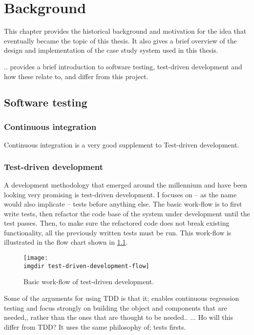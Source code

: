 

\chapter{Background}
This chapter provides the historical background and motivation for the idea that eventually became the topic of this thesis. It also gives a brief overview of the design and implementation of the case study system used in this thesis.

.. provides a brief introduction to software testing, test-driven development and how these relate to, and differ from this project.

\section{Software testing}

\subsection{Continuous integration}
Continuous integration is a very good supplement to Test-driven development.
\subsection{Test-driven development}
A development methodology that emerged around the millennium and have been looking very promising is test-driven development. I focuses on -- as the name would also implicate -- tests before anything else. The basic work-flow is to first write tests, then refactor the code base of the system under development until the test passes. Then, to make sure the refactored code does not break existing functionality, all the previously written tests must be run. This work-flow is illustrated in the flow chart shown in \ref{fig:test-driven-development-flow}.

\begin{figure}[!htbp]
\centering
\texttt{[image: \\imgdir test-driven-development-flow]}
\caption{Basic work-flow of test-driven development.}
\label{fig:test-driven-development-flow}
\end{figure}

Some of the arguments for using TDD is that it; enables continuous regression testing and focus strongly on building the object and components that are needed,, rather than the ones that are thought to be needed.\cite{george2003}.
...
Ho will this differ from TDD? It uses the same philosophy of; tests firsts.


